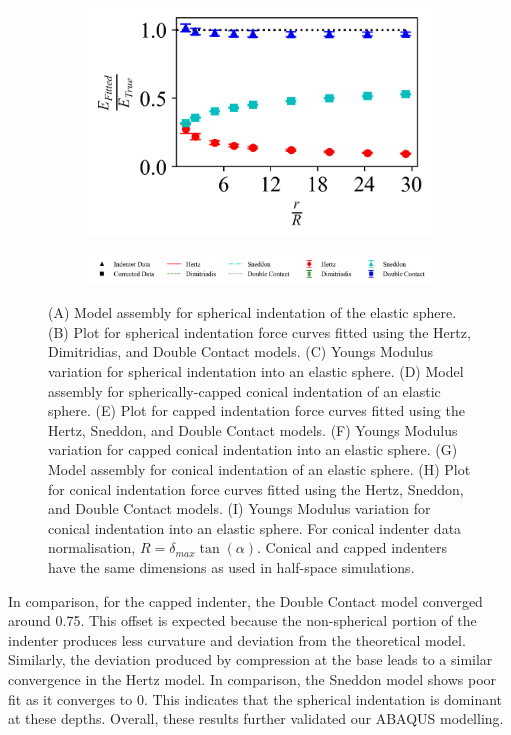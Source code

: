 \begin{figure}[H]
\begin{subfigure}[t]{0.32\textwidth}
        \includegraphics[width=1\linewidth]{Figures/Cone-Sphere-Youngs_Modulus.png}
    \end{subfigure}

    \hfill
    
    \begin{subfigure}[t]{1\textwidth}
        \includegraphics[width=1\linewidth]{Figures/Spheres-Legend.png}
    \end{subfigure}

    
    \caption{\label{fig: Sphere-Contact_Models}(A) Model assembly for spherical indentation of the elastic sphere. (B) Plot for spherical indentation force curves fitted using the Hertz, Dimitridias, and Double Contact models. (C) Youngs Modulus variation for spherical indentation into an elastic sphere. (D) Model assembly for spherically-capped conical indentation of an elastic sphere. (E) Plot for capped indentation force curves fitted using the Hertz, Sneddon, and Double Contact models. (F) Youngs Modulus variation for capped conical indentation into an elastic sphere. (G) Model assembly for conical indentation of an elastic sphere. (H) Plot for conical indentation force curves fitted using the Hertz, Sneddon, and Double Contact models. (I) Youngs Modulus variation for conical indentation into an elastic sphere. For conical indenter data normalisation, $R=\delta_{max}\tan(\alpha)$. Conical and capped indenters have the same dimensions as used in half-space simulations.}
    
\end{figure}
 
In comparison, for the capped indenter, the Double Contact model converged around 0.75. This offset is expected because the non-spherical portion of the indenter produces less curvature and deviation from the theoretical model. Similarly, the deviation produced by compression at the base leads to a similar convergence in the Hertz model. In comparison, the Sneddon model shows poor fit as it converges to 0. This indicates that the spherical indentation is dominant at these depths. Overall, these results further validated our ABAQUS modelling.

